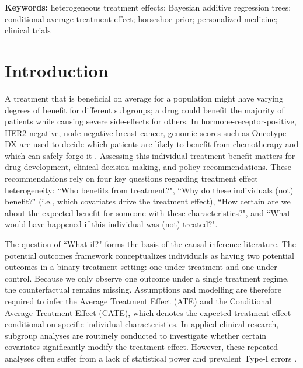 \documentclass[12pt]{article}
\begin{document}
\noindent\textbf{Keywords:} heterogeneous treatment effects; Bayesian additive regression trees; conditional average treatment effect; horseshoe prior; personalized medicine; clinical trials


\section{Introduction}
A treatment that is beneficial on average for a population might have varying degrees of benefit for different subgroups; a drug could benefit the majority of patients while causing severe side-effects for others. In hormone-receptor-positive, HER2-negative, node-negative breast cancer, genomic scores such as Oncotype DX are used to decide which patients are likely to benefit from chemotherapy and which can safely forgo it \citep{sparano2018adjuvant}. Assessing this individual treatment benefit matters for drug development, clinical decision-making, and policy recommendations. These recommendations rely on four key questions regarding treatment effect heterogeneity: ``Who benefits from treatment?", ``Why do these individuals (not) benefit?" (i.e., which covariates drive the treatment effect), ``How certain are we about the expected benefit for someone with these characteristics?", and ``What would have happened if this individual was (not) treated?".

The question of ``What if?" forms the basis of the causal inference literature. The potential outcomes framework \citep{rubin1974estimating} conceptualizes individuals as having two potential outcomes in a binary treatment setting: one under treatment and one under control. Because we only observe one outcome under a single treatment regime, the counterfactual remains missing. Assumptions and modelling are therefore required to infer the Average Treatment Effect (ATE) and the Conditional Average Treatment Effect (CATE), which denotes the expected treatment effect conditional on specific individual characteristics. In applied clinical research, subgroup analyses are routinely conducted to investigate whether certain covariates significantly modify the treatment effect. However, these repeated analyses often suffer from a lack of statistical power and prevalent Type-I errors \citep{kent2020predictive}.
\end{document}
